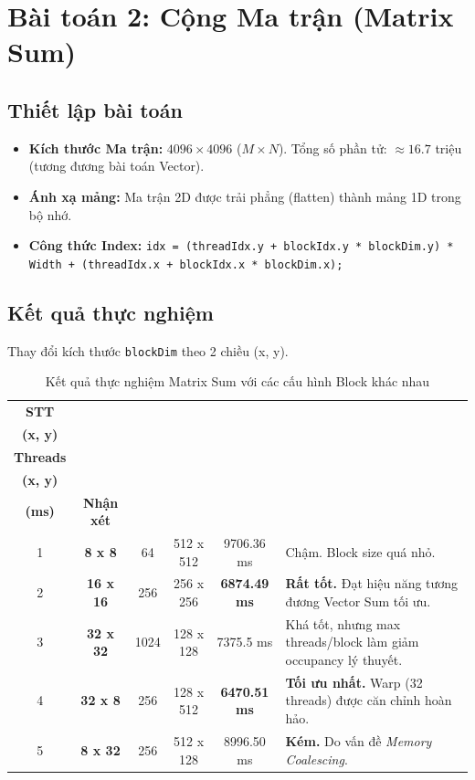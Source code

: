 \documentclass{article}
\begin{document}
    \section{Bài toán 2: Cộng Ma trận (Matrix Sum)}

    \subsection{Thiết lập bài toán}

    \begin{itemize}
        \item \textbf{Kích thước Ma trận:} $4096 \times 4096$ ($M \times N$). Tổng số phần tử: $\approx 16.7$ triệu (tương đương bài toán Vector).
        \item \textbf{Ánh xạ mảng:} Ma trận 2D được trải phẳng (flatten) thành mảng 1D trong bộ nhớ.
        \item \textbf{Công thức Index:} \lstinline|idx = (threadIdx.y + blockIdx.y * blockDim.y) * Width + (threadIdx.x + blockIdx.x * blockDim.x);|
    \end{itemize}

    \subsection{Kết quả thực nghiệm}

    Thay đổi kích thước \lstinline|blockDim| theo 2 chiều (x, y).

    \begin{table}[h!]
    \centering
    \small
    \begin{tabular}{cccccp{5.5cm}}
    \toprule
    \textbf{STT} & \makecell{\textbf{Cấu hình Block} \\ \textbf{(x, y)}} & \makecell{\textbf{Tổng} \\ \textbf{Threads}} & \makecell{\textbf{Grid Size} \\ \textbf{(x, y)}} & \makecell{\textbf{Thời gian} \\ \textbf{(ms)}} & \textbf{Nhận xét} \\
    \midrule
    1 & \textbf{8 x 8} & 64 & 512 x 512 & 9706.36 ms & Chậm. Block size quá nhỏ. \\
    2 & \textbf{16 x 16} & 256 & 256 x 256 & \textbf{6874.49 ms} & \textbf{Rất tốt.} Đạt hiệu năng tương đương Vector Sum tối ưu. \\
    3 & \textbf{32 x 32} & 1024 & 128 x 128 & 7375.5 ms & Khá tốt, nhưng max threads/block làm giảm occupancy lý thuyết. \\
    4 & \textbf{32 x 8} & 256 & 128 x 512 & \textbf{6470.51 ms} & \textbf{Tối ưu nhất.} Warp (32 threads) được căn chỉnh hoàn hảo. \\
    5 & \textbf{8 x 32} & 256 & 512 x 128 & 8996.50 ms & \textbf{Kém.} Do vấn đề \textit{Memory Coalescing}. \\
    \bottomrule
    \end{tabular}
    \caption{Kết quả thực nghiệm Matrix Sum với các cấu hình Block khác nhau}
    \end{table}
\end{document}
